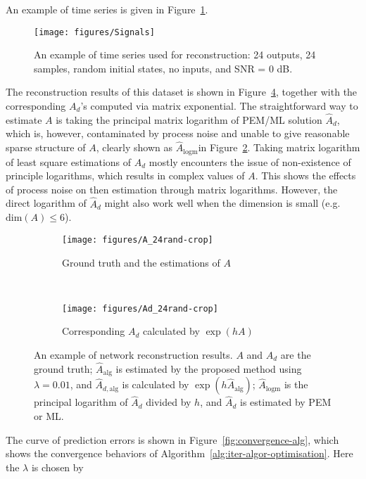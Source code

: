 \documentclass[letterpaper,10pt,journal,final]{IEEEtran}
\theoremstyle{definition}
\theoremstyle{remark}
\begin{document}
An example of time series is given in Figure~\ref{fig:output-signals}.
\begin{figure}[htbp]   \centering
\texttt{[image: figures/Signals]}
  \caption{An example of time series used for reconstruction: 24 outputs, 24
    samples, random initial states, no inputs, and SNR = 0 dB.}
  \label{fig:output-signals}
\end{figure}
The reconstruction results of this dataset is shown in
Figure~\ref{fig:matrix-plot-A-Ad}, together with the corresponding $A_d$'s
computed via matrix exponential. The straightforward way to estimate $A$ is
taking the principal matrix logarithm of PEM/ML solution $\hat{A}_{d}$,
which is, however, contaminated by process noise and unable to give reasonable
sparse structure of $A$, clearly shown as $\hat{A}_{\mathrm{logm}}$in
Figure~\ref{fig:subfig-A}. Taking matrix logarithm of least square estimations
of $A_d$ mostly encounters the issue of non-existence of principle logarithms,
which results in complex values of $A$. This shows the effects of process noise
on then estimation through matrix logarithms. However, the direct logarithm of
$\hat{A}_d$ might also work well when the dimension is small
(e.g. $\mathrm{dim}(A) \leq 6$).
\begin{figure}[htbp]
  \centering
  \begin{subfigure}[b]{0.48\textwidth}
    \texttt{[image: figures/A\_24rand-crop]}
    \caption{Ground truth and the estimations of $A$}
    \label{fig:subfig-A}
  \end{subfigure}
  \\ \begin{subfigure}[b]{0.48\textwidth}
    \texttt{[image: figures/Ad\_24rand-crop]}
    \caption{Corresponding $A_d$ calculated by $\exp(hA)$}
    \label{fig:subfig-Ad}
  \end{subfigure}
  \caption{An example of network reconstruction results.  $A$ and $A_d$ are the
    ground truth; $\hat{A}_\mathrm{alg}$ is estimated by the proposed method
    using $\lambda = 0.01$, and $\hat{A}_{d, \mathrm{alg}}$ is calculated by
    $\exp(h \hat{A}_{\mathrm{alg}})$; $\hat{A}_\mathrm{logm}$ is the principal
    logarithm of $\hat{A}_{d}$ divided by $h$, and $\hat{A}_d$ is estimated by
    PEM or ML.  }
  \label{fig:matrix-plot-A-Ad}
\end{figure}
The curve of prediction errors is shown in Figure~\ref{fig:convergence-alg},
which shows the convergence behaviors of
Algorithm~\ref{alg:iter-algor-optimisation}. Here the $\lambda$ is chosen by
\end{document}
